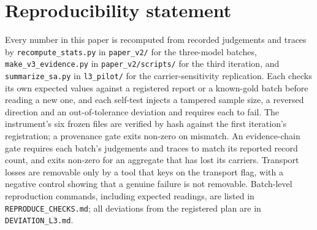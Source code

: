 \documentclass[11pt]{article}
\begin{document}
\begin{sloppypar}
\begin{table}[t]
\centering
\caption{Post-treatment subgroup of the carrier-sensitivity replication: pairs in which the deletion arm wrote before the invalidation event. Reported descriptively; the subgroup is selected on a variable the manipulation moves.}
\label{tab:6}

\end{table}

\section*{Reproducibility statement}

Every number in this paper is recomputed from recorded judgements and traces by \texttt{recompute\_stats.py} in \texttt{paper\_v2/} for the three-model batches, \texttt{make\_v3\_evidence.py} in \texttt{paper\_v2/scripts/} for the third iteration, and \texttt{summarize\_sa.py} in \texttt{l3\_pilot/} for the carrier-sensitivity replication. Each checks its own expected values against a registered report or a known-gold batch before reading a new one, and each self-test injects a tampered sample size, a reversed direction and an out-of-tolerance deviation and requires each to fail. The instrument's six frozen files are verified by hash against the first iteration's registration; a provenance gate exits non-zero on mismatch. An evidence-chain gate requires each batch's judgements and traces to match its reported record count, and exits non-zero for an aggregate that has lost its carriers. Transport losses are removable only by a tool that keys on the transport flag, with a negative control showing that a genuine failure is not removable. Batch-level reproduction commands, including expected readings, are listed in \texttt{REPRODUCE\_CHECKS.md}; all deviations from the registered plan are in \texttt{DEVIATION\_L3.md}.



\end{sloppypar}
\end{document}
